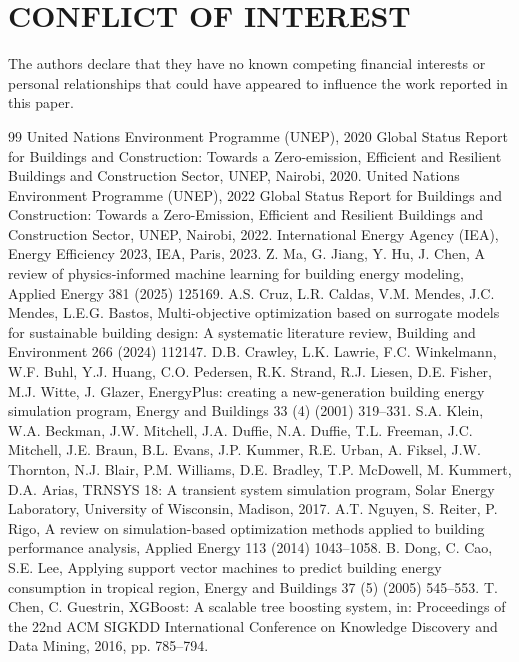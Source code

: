 \documentclass[11pt]{article}
\begin{document}
\section*{CONFLICT OF INTEREST}
The authors declare that they have no known competing financial interests or personal relationships that could have appeared to influence the work reported in this paper.

\begin{thebibliography}{99}
 United Nations Environment Programme (UNEP), 2020 Global Status Report for Buildings and Construction: Towards a Zero-emission, Efficient and Resilient Buildings and Construction Sector, UNEP, Nairobi, 2020.
 United Nations Environment Programme (UNEP), 2022 Global Status Report for Buildings and Construction: Towards a Zero-Emission, Efficient and Resilient Buildings and Construction Sector, UNEP, Nairobi, 2022.
 International Energy Agency (IEA), Energy Efficiency 2023, IEA, Paris, 2023.
 Z. Ma, G. Jiang, Y. Hu, J. Chen, A review of physics-informed machine learning for building energy modeling, Applied Energy 381 (2025) 125169.
 A.S. Cruz, L.R. Caldas, V.M. Mendes, J.C. Mendes, L.E.G. Bastos, Multi-objective optimization based on surrogate models for sustainable building design: A systematic literature review, Building and Environment 266 (2024) 112147.
 D.B. Crawley, L.K. Lawrie, F.C. Winkelmann, W.F. Buhl, Y.J. Huang, C.O. Pedersen, R.K. Strand, R.J. Liesen, D.E. Fisher, M.J. Witte, J. Glazer, EnergyPlus: creating a new-generation building energy simulation program, Energy and Buildings 33 (4) (2001) 319--331.
 S.A. Klein, W.A. Beckman, J.W. Mitchell, J.A. Duffie, N.A. Duffie, T.L. Freeman, J.C. Mitchell, J.E. Braun, B.L. Evans, J.P. Kummer, R.E. Urban, A. Fiksel, J.W. Thornton, N.J. Blair, P.M. Williams, D.E. Bradley, T.P. McDowell, M. Kummert, D.A. Arias, TRNSYS 18: A transient system simulation program, Solar Energy Laboratory, University of Wisconsin, Madison, 2017.
 A.T. Nguyen, S. Reiter, P. Rigo, A review on simulation-based optimization methods applied to building performance analysis, Applied Energy 113 (2014) 1043--1058.
 B. Dong, C. Cao, S.E. Lee, Applying support vector machines to predict building energy consumption in tropical region, Energy and Buildings 37 (5) (2005) 545--553.
 T. Chen, C. Guestrin, XGBoost: A scalable tree boosting system, in: Proceedings of the 22nd ACM SIGKDD International Conference on Knowledge Discovery and Data Mining, 2016, pp. 785--794.

\end{thebibliography}
\end{document}
